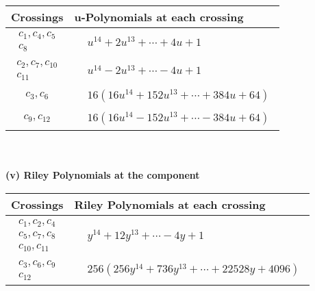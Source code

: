 \documentclass[1p]{elsarticle_modified}
\theoremstyle{definition}
\begin{document}
\begin{tabular}{m{50pt}|m{274pt}}
Crossings & \hspace{64pt}u-Polynomials at each crossing \\
\hline $$\begin{aligned}c_{1},c_{4},c_{5}\\c_{8}\end{aligned}$$&$\begin{aligned}
&u^{14}+2 u^{13}+\cdots+4 u+1
\end{aligned}$\\
\hline $$\begin{aligned}c_{2},c_{7},c_{10}\\c_{11}\end{aligned}$$&$\begin{aligned}
&u^{14}-2 u^{13}+\cdots-4 u+1
\end{aligned}$\\
\hline $$\begin{aligned}c_{3},c_{6}\end{aligned}$$&$\begin{aligned}
&16(16 u^{14}+152 u^{13}+\cdots+384 u+64)
\end{aligned}$\\
\hline $$\begin{aligned}c_{9},c_{12}\end{aligned}$$&$\begin{aligned}
&16(16 u^{14}-152 u^{13}+\cdots-384 u+64)
\end{aligned}$\\
\hline
\end{tabular}\\~\\
\newpage\renewcommand{\arraystretch}{1}
\flushleft \textbf{(v) Riley Polynomials at the component}\newline \\
\begin{tabular}{m{50pt}|m{274pt}}
Crossings & \hspace{64pt}Riley Polynomials at each crossing \\
\hline $$\begin{aligned}c_{1},c_{2},c_{4}\\c_{5},c_{7},c_{8}\\c_{10},c_{11}\end{aligned}$$&$\begin{aligned}
&y^{14}+12 y^{13}+\cdots-4 y+1
\end{aligned}$\\
\hline $$\begin{aligned}c_{3},c_{6},c_{9}\\c_{12}\end{aligned}$$&$\begin{aligned}
&256(256 y^{14}+736 y^{13}+\cdots+22528 y+4096)
\end{aligned}$\\
\hline
\end{tabular}\\~\\
\end{document}
